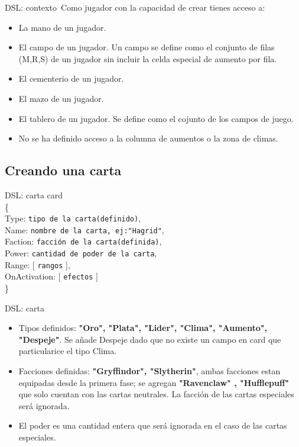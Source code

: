 \documentclass[a4paper, 12pt]{beamer}
\begin{document}
\begin{frame}{\textcolor{plata}{DSL: contexto}}\
Como jugador con la capacidad de crear tienes acceso a:
\begin{itemize}
\item La mano de un jugador.
\item El campo de un jugador. Un campo se define como el conjunto de filas (M,R,S) de un jugador sin incluir la celda especial de aumento por fila.
\item El cementerio de un jugador.
\item El mazo de un jugador.
\item El tablero de un jugador. Se define como el cojunto de los campos de juego.
\item No se ha definido acceso a la columna de aumentos o la zona de climas.
\end{itemize}
\end{frame}

\subsection{Creando una carta}
\begin{frame}{\textcolor{plata}{DSL: carta}}
card\\
\{\\
\hspace{1cm} Type: \texttt{tipo de la carta(definido)},\\
\hspace{1cm} Name: \texttt{nombre de la carta, ej:"Hagrid"},\\
\hspace{1cm} Faction: \texttt{facción de la carta(definida)},\\
\hspace{1cm} Power: \texttt{cantidad de poder de la carta},\\
\hspace{1cm} Range: [ \texttt{rangos} ],\\
\hspace{1cm} OnActivation: [ \texttt{efectos} ]\\
\}
\end{frame}

\begin{frame}{\textcolor{plata}{DSL: carta}}
\begin{itemize}
\item Tipos definidos: \textbf{"Oro", "Plata", "Lider", "Clima", "Aumento", "Despeje"}. Se añade Despeje dado que no existe un campo en card que particularice el tipo Clima.
\item Facciones definidas: \textbf{"Gryffindor", "Slytherin"}, ambas facciones estan equipadas desde la primera fase; se agregan \textbf{"Ravenclaw" , "Hufflepuff"} que solo cuentan con las cartas neutrales. La facción de las cartas especiales será ignorada.
\item El poder es una cantidad entera que será ignorada en el caso de las cartas especiales.
\end{itemize}
\end{frame}
\end{document}
